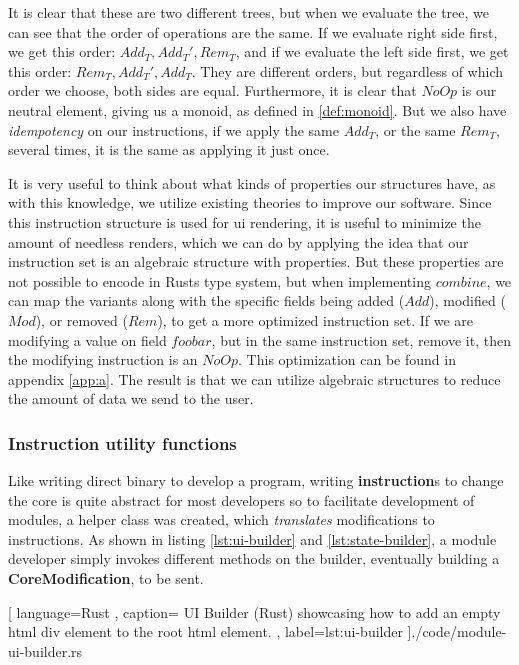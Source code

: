 It is clear that these are two different trees, but when we evaluate the tree,
we can see that the order of operations are the same. If we evaluate right side
first, we get this order: $Add_T, Add_T', Rem_T$, and if we evaluate the left
side first, we get this order: $Rem_T, Add_T', Add_T$. They are different
orders, but regardless of which order we choose, both sides are equal.
Furthermore, it is clear that $NoOp$ is our neutral element, giving us a monoid,
as defined in \ref{def:monoid}. But we also have \textit{idempotency} on our
instructions, if we apply the same $Add_T$, or the same $Rem_T$, several times,
it is the same as applying it just once.

It is very useful to think about what kinds of properties our structures have,
as with this knowledge, we utilize existing theories to improve our software.
Since this instruction structure is used for \gls*{ui} rendering, it is useful
to minimize the amount of needless renders, which we can do by applying the idea
that our instruction set is an algebraic structure with properties. But these
properties are not possible to encode in Rusts type system, but when
implementing $combine$, we can map the variants along with the specific fields
being added ($Add$), modified ($Mod$), or removed ($Rem$), to get a more
optimized instruction set. If we are modifying a value on field $foobar$, but in
the same instruction set, remove it, then the modifying instruction is an
$NoOp$. This optimization can be found in appendix \ref{app:a}. The result is
that we can utilize algebraic structures to reduce the amount of data we send
to the user.


\subsubsection{Instruction utility functions}

Like writing direct binary to develop a program, writing \textbf{instruction}s to
change the core is quite abstract for most developers so to facilitate development
of modules, a helper class was created, which \textit{translates} modifications
to instructions. As shown in listing \ref{lst:ui-builder} and
\ref{lst:state-builder}, a module developer simply invokes different methods on
the builder, eventually building a \textbf{CoreModification}, to be sent.

\begin{center}
  
   [ language=Rust
   , caption={
     UI Builder (Rust) showcasing how to add an empty \gls*{html} div element to
     the root \gls*{html} element.
   }
   , label=lst:ui-builder
   ]{./code/module-ui-builder.rs}
\end{center}

